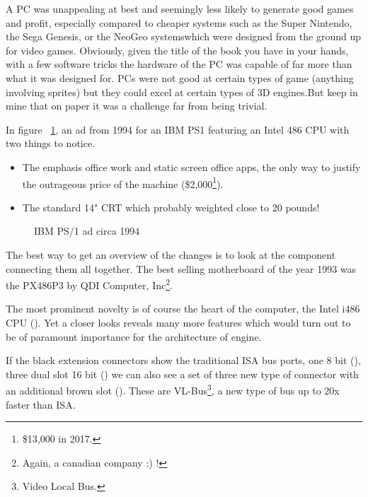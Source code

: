 \par
 A PC was unappealing at best and seemingly less likely to generate good games and profit, especially compared to cheaper systems such as the Super Nintendo, the Sega Genesis, or the NeoGeo systemswhich were designed from the ground up for video games. Obviously, given the title of the book you have in your hands, with a few software tricks the hardware of the PC was capable of far more than what it was designed for. PCs were not good at certain types of game (anything involving sprites) but they could excel at certain types of 3D engines.But keep in mine that on paper it was a challenge far from being trivial.\\
\par

In figure ~\ref{ibm_ps1_top}, an ad from 1994 for an IBM PS1 featuring an Intel 486 CPU with two things to notice.
\begin{itemize}
\item The emphasis office work and static screen office apps, the only way to justify the outrageous price of the machine (\$2,000\footnote{\$13,000 in 2017.}). 
\item The standard 14" CRT which probably weighted close to 20 pounds!\\
\end{itemize}
\par
\vspace{2 in}
\par
\begin{figure}[H] \centering
{}
\caption{IBM PS/1 ad circa 1994}
\label{ibm_ps1_top}
\end{figure}


















\cleartoleftpage
 
The best way to get an overview of the changes is to look at the component connecting them all together. The best selling motherboard of the year 1993 was the PX486P3 by QDI Computer, Inc\footnote{Again, a canadian company :) !}.\\

\par
The most prominent novelty is of course the heart of the computer, the Intel i486 CPU (). Yet a closer looks reveals many more features which would turn out to be of paramount importance for the architecture of \doom engine.\\
\par 
If the black extension connectors show the traditional ISA bus ports, one 8 bit (), three dual slot 16 bit () we can also see a set of three new type of connector with an additional brown slot (). These are VL-Bus\footnote{Video Local Bus.}, a new type of bus up to 20x faster than ISA.

